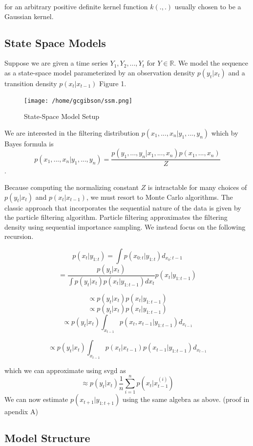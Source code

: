 \documentclass[]{article}
\begin{document}
for an arbitrary positive definite kernel function \(k(.,.)\) usually
chosen to be a Gaussian kernel.

\subsection{State Space Models}\label{state-space-models}

Suppose we are given a time series \(Y_1,Y_2,...,Y_t\) for
\(Y \in \mathbb{R}\). We model the sequence as a state-space model
parameterized by an observation density \(p(y_t | x_t)\) and a
transition density \(p(x_t | x_{t-1})\) Figure 1.

\begin{figure}[htbp]
\centering
\texttt{[image: /home/gcgibson/ssm.png]}
\caption{State-Space Model Setup}
\end{figure}

We are interested in the filtering distribution
\(p(x_1,...,x_n | y_1,...,y_n)\) which by Bayes formula is
\[p(x_1,...,x_n | y_1,...,y_n) = \frac{p(y_1,...,y_n | x_1,...,x_n) p(x_1,...,x_n)}{Z}\].

Because computing the normalizing constant \(Z\) is intractable for many
choices of \(p(y_t | x_t)\) and \(p(x_t | x_{t-1})\), we must resort to
Monte Carlo algorithms. The classic approach that incorporates the
sequential nature of the data is given by the particle filtering
algorithm. Particle filtering approximates the filtering density using
sequential importance sampling. We instead focus on the following
recursion.

\[p(x_t | y_{1:t}) = \int p(x_{0:t} | y_{1:t})d_{x_0:t-1}\]
\[=\frac{p(y_t | x_t)}{\int p(y_t|x_t)p(x_t | y_{1:t-1})dx_t}p(x_t | y_{1:t-1})\]

\[\propto p(y_t|x_t)p(x_t | y_{1:t-1})\]
\[\propto p(y_t|x_t)p(x_t | y_{1:t-1})\]
\[\propto p(y_t|x_t)\int_{x_{t-1}}p(x_t,x_{t-1} | y_{1:t-1})d_{x_{t-1}}\]

\[\propto p(y_t|x_t)\int_{x_{t-1}}p(x_t |x_{t-1} )p(x_{t-1}| y_{1:t-1})d_{x_{t-1}}\]

which we can approximate using svgd as
\[\approx p(y_t|x_t) \frac{1}{n}\sum_{i=1}^n p(x_t | x_{t-1}^{(i)})\] We
can now estimate \(p(x_{t+1}|y_{1:t+1})\) using the same algebra as
above. (proof in apendix A)

\subsection{Model Structure}\label{model-structure}
\end{document}
